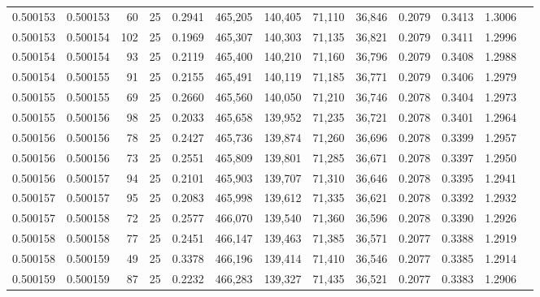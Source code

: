 \begin{tabular}{rrrrrrrrrrrrr}
0.500153 & 0.500153 &  60 &  25 &                                     0.2941 & 465,205 & 140,405 &  71,110 &  36,846 & 0.2079 & 0.3413 & 1.3006 \\
0.500153 & 0.500154 & 102 &  25 &                                     0.1969 & 465,307 & 140,303 &  71,135 &  36,821 & 0.2079 & 0.3411 & 1.2996 \\
0.500154 & 0.500154 &  93 &  25 &                                     0.2119 & 465,400 & 140,210 &  71,160 &  36,796 & 0.2079 & 0.3408 & 1.2988 \\
0.500154 & 0.500155 &  91 &  25 &                                     0.2155 & 465,491 & 140,119 &  71,185 &  36,771 & 0.2079 & 0.3406 & 1.2979 \\
0.500155 & 0.500155 &  69 &  25 &                                     0.2660 & 465,560 & 140,050 &  71,210 &  36,746 & 0.2078 & 0.3404 & 1.2973 \\
0.500155 & 0.500156 &  98 &  25 &                                     0.2033 & 465,658 & 139,952 &  71,235 &  36,721 & 0.2078 & 0.3401 & 1.2964 \\
0.500156 & 0.500156 &  78 &  25 &                                     0.2427 & 465,736 & 139,874 &  71,260 &  36,696 & 0.2078 & 0.3399 & 1.2957 \\
0.500156 & 0.500156 &  73 &  25 &                                     0.2551 & 465,809 & 139,801 &  71,285 &  36,671 & 0.2078 & 0.3397 & 1.2950 \\
0.500156 & 0.500157 &  94 &  25 &                                     0.2101 & 465,903 & 139,707 &  71,310 &  36,646 & 0.2078 & 0.3395 & 1.2941 \\
0.500157 & 0.500157 &  95 &  25 &                                     0.2083 & 465,998 & 139,612 &  71,335 &  36,621 & 0.2078 & 0.3392 & 1.2932 \\
0.500157 & 0.500158 &  72 &  25 &                                     0.2577 & 466,070 & 139,540 &  71,360 &  36,596 & 0.2078 & 0.3390 & 1.2926 \\
0.500158 & 0.500158 &  77 &  25 &                                     0.2451 & 466,147 & 139,463 &  71,385 &  36,571 & 0.2077 & 0.3388 & 1.2919 \\
0.500158 & 0.500159 &  49 &  25 &                                     0.3378 & 466,196 & 139,414 &  71,410 &  36,546 & 0.2077 & 0.3385 & 1.2914 \\
0.500159 & 0.500159 &  87 &  25 &                                     0.2232 & 466,283 & 139,327 &  71,435 &  36,521 & 0.2077 & 0.3383 & 1.2906 \\

\end{tabular}
